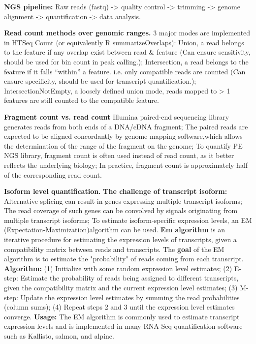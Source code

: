 \vspace{0.1em}\noindent
\textbf{NGS pipeline:} Raw reads (fastq) -> quality control -> trimming -> genome alignment -> quantification -> data analysis.

\vspace{0.1em}\noindent
\textbf{Read count methods over genomic ranges.} 3 major modes are implemented in HTSeq Count (or equivalently R summarizeOverlaps):  Union\*, a read belongs to the feature if any overlap exist between read \& feature (Can ensure sensitivity, should be used for bin count in peak calling.); Intersection\*, a read belongs to the feature if it falls “within” a feature. i.e. only compatible reads are counted (Can ensure specificity, should be used for transcript quantification.); IntersectionNotEmpty\*, a loosely defined union mode, reads mapped to > 1 features are still counted to the compatible feature.

\vspace{0.1em}\noindent
\textbf{Fragment count vs. read count} Illumina paired-end sequencing library generates reads from both ends of a DNA/cDNA fragment; The paired reads are expected to be aligned concordantly by genome mapping software,which allows the determination of the range of the fragment on the genome; To quantify PE NGS library, fragment count is often used instead of read count, as it better reflects the underlying biology; In practice, fragment count is approximately half of the corresponding read count.

\vspace{0.1em}\noindent
\textbf{Isoform level quantification.} \textbf{The challenge of transcript isoform:} Alternative splicing can result in genes expressing multiple transcript isoforms; The read coverage of such genes can be convolved by signals originating from multiple transcript isoforms; To estimate isoform-specific expression levels, an EM (Expectation-Maximization)algorithm can be used. \textbf{Em algorithm} is an iterative procedure for estimating the expression levels of transcripts, given a compatibility matrix between reads and transcripts. The \textbf{goal} of the EM algorithm is to estimate the "probability" of reads coming from each transcript. \textbf{Algorithm:} (1) Initialize with some random expression level estimates; (2) E-step: Estimate the probability of reads being assigned to different transcripts, given the compatibility matrix and the current expression level estimates; (3) M-step: Update the expression level estimates by summing the read probabilities (column sums); (4) Repeat steps 2 and 3 until the expression level estimates converge. \textbf{Usage:} The EM algorithm is commonly used to estimate transcript expression levels and is implemented in many RNA-Seq quantification software such as Kallisto, salmon, and alpine.

